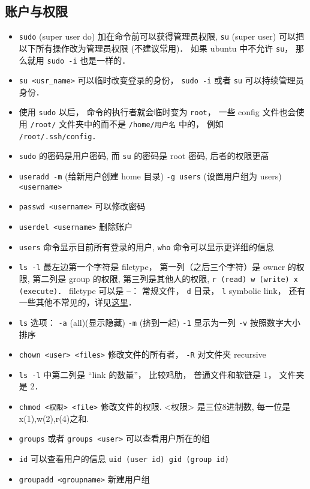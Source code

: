 \subsection{账户与权限}
\begin{itemize}
\item \verb`sudo` (super user do) 加在命令前可以获得管理员权限, \verb`su` (super user) 可以把以下所有操作改为管理员权限 (不建议常用)． 如果 ubuntu 中不允许 \verb|su|， 那么就用 \verb|sudo -i| 也是一样的．
\item \verb`su <usr_name>` 可以临时改变登录的身份， \verb|sudo -i| 或者 \verb|su| 可以持续管理员身份．
\item 使用 \verb|sudo| 以后， 命令的执行者就会临时变为 \verb|root|， 一些 config 文件也会使用 \verb|/root/| 文件夹中的而不是 \verb|/home/用户名| 中的， 例如 \verb|/root/.ssh/config|．
\item \verb`sudo` 的密码是用户密码, 而 \verb`su` 的密码是 root 密码, 后者的权限更高
\item \verb`useradd -m` (给新用户创建 home 目录) \verb`-g users` (设置用户组为 users) \verb`<username>`
\item \verb`passwd <username>` 可以修改密码
\item \verb`userdel <username>` 删除账户
\item \verb`users` 命令显示目前所有登录的用户, \verb`who` 命令可以显示更详细的信息
\item \verb`ls -l` 最左边第一个字符是 filetype， 第一列（之后三个字符）是 owner 的权限, 第二列是 group 的权限, 第三列是其他人的权限, \verb`r (read) w (write) x (execute)`． filetype 可以是 \verb|–|： 常规文件， \verb|d| 目录， \verb|l| symbolic link， 还有一些其他不常见的，详见\href{https://linuxconfig.org/identifying-file-types-in-linux}{这里}．
\item \verb`ls` 选项： \verb`-a` (all)(显示隐藏) \verb`-m` (挤到一起) \verb`-1` 显示为一列 \verb`-v` 按照数字大小排序
\item \verb`chown <user> <files>` 修改文件的所有者， \verb|-R| 对文件夹 recursive
\item \verb|ls -l| 中第二列是 “link 的数量”， 比较鸡肋， 普通文件和软链是 1， 文件夹是 2．
\item \verb`chmod <权限> <file>` 修改文件的权限. <权限> 是三位8进制数, 每一位是 x(1),w(2),r(4)之和.
\item \verb`groups` 或者 \verb`groups <user>` 可以查看用户所在的组
\item \verb`id` 可以查看用户的信息 \verb`uid (user id) gid (group id)`
\item \verb`groupadd <groupname>` 新建用户组

\end{itemize}
